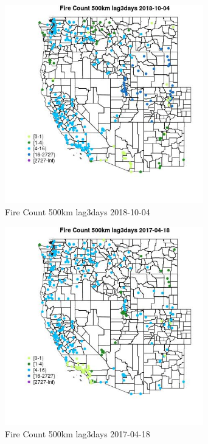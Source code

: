 \begin{figure} 
\centering  
\includegraphics[width=0.77\textwidth]{Code_Outputs/Report_ML_input_PM25_Step4_part_f_de_duplicated_aves_prioritize_24hr_obswNAs_MapObsFire_Count_500km_lag3days2018-10-04.jpg} 
\caption{\label{fig:Report_ML_input_PM25_Step4_part_f_de_duplicated_aves_prioritize_24hr_obswNAsMapObsFire_Count_500km_lag3days2018-10-04}Fire Count 500km lag3days 2018-10-04} 
\end{figure} 
 

\begin{figure} 
\centering  
\includegraphics[width=0.77\textwidth]{Code_Outputs/Report_ML_input_PM25_Step4_part_f_de_duplicated_aves_prioritize_24hr_obswNAs_MapObsFire_Count_500km_lag3days2017-04-18.jpg} 
\caption{\label{fig:Report_ML_input_PM25_Step4_part_f_de_duplicated_aves_prioritize_24hr_obswNAsMapObsFire_Count_500km_lag3days2017-04-18}Fire Count 500km lag3days 2017-04-18} 
\end{figure} 
 

